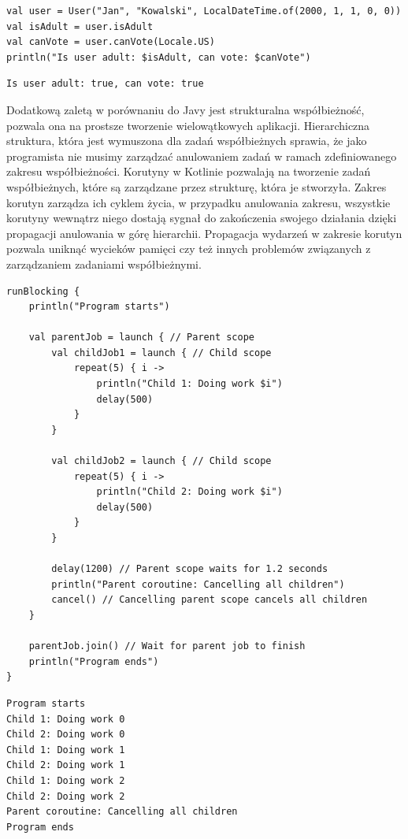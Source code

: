\begin{lstlisting}[caption=Przykład użycia extension functions]
val user = User("Jan", "Kowalski", LocalDateTime.of(2000, 1, 1, 0, 0))
val isAdult = user.isAdult
val canVote = user.canVote(Locale.US)
println("Is user adult: $isAdult, can vote: $canVote")
\end{lstlisting}
\begin{lstlisting}[caption=Wynik]
Is user adult: true, can vote: true
\end{lstlisting}
Dodatkową zaletą w porównaniu do Javy jest strukturalna współbieżność, pozwala ona na prostsze tworzenie wielowątkowych aplikacji.
\cite{structuredConcurrency}
Hierarchiczna struktura, która jest wymuszona dla zadań współbieżnych sprawia, że jako programista nie musimy zarządzać anulowaniem zadań w ramach zdefiniowanego zakresu współbieżności.
Korutyny w Kotlinie pozwalają na tworzenie zadań współbieżnych, które są zarządzane przez strukturę, która je stworzyła.\cite{effectiveKotlin}
Zakres korutyn zarządza ich cyklem życia, w przypadku anulowania zakresu, wszystkie korutyny wewnątrz niego dostają sygnał do zakończenia swojego działania dzięki propagacji anulowania w górę hierarchii.
Propagacja wydarzeń w zakresie korutyn pozwala uniknąć wycieków pamięci czy też innych problemów związanych z zarządzaniem zadaniami współbieżnymi.
\begin{lstlisting}[caption=Przykład korutyny w Kotlinie]
runBlocking {
    println("Program starts")

    val parentJob = launch { // Parent scope
        val childJob1 = launch { // Child scope
            repeat(5) { i ->
                println("Child 1: Doing work $i")
                delay(500)
            }
        }

        val childJob2 = launch { // Child scope
            repeat(5) { i ->
                println("Child 2: Doing work $i")
                delay(500)
            }
        }

        delay(1200) // Parent scope waits for 1.2 seconds
        println("Parent coroutine: Cancelling all children")
        cancel() // Cancelling parent scope cancels all children
    }

    parentJob.join() // Wait for parent job to finish
    println("Program ends")
}
\end{lstlisting}
\begin{lstlisting}[caption=Wynik]
Program starts
Child 1: Doing work 0
Child 2: Doing work 0
Child 1: Doing work 1
Child 2: Doing work 1
Child 1: Doing work 2
Child 2: Doing work 2
Parent coroutine: Cancelling all children
Program ends
\end{lstlisting}
